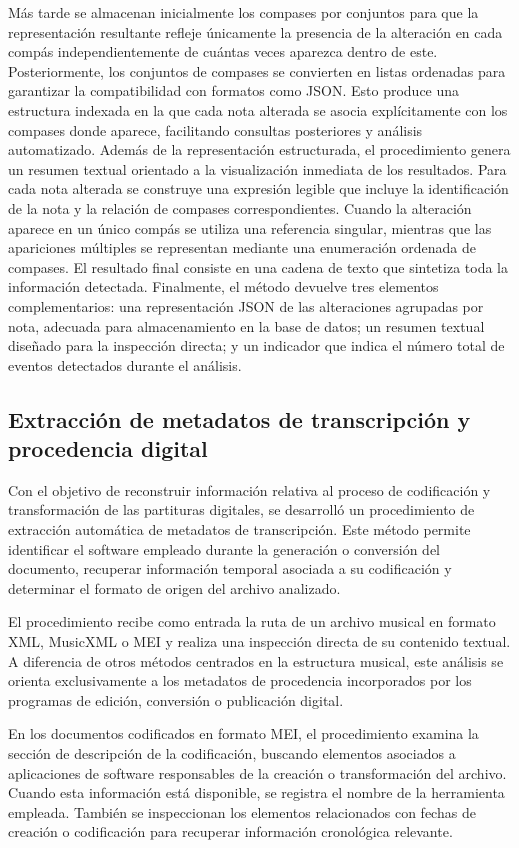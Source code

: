Más tarde se almacenan inicialmente los compases por conjuntos para que la representación resultante refleje únicamente la presencia de la alteración en cada compás independientemente de cuántas veces aparezca dentro de este. Posteriormente, los conjuntos de compases se convierten en listas ordenadas para garantizar la compatibilidad con formatos como JSON. Esto produce una estructura indexada en la que cada nota alterada se asocia explícitamente con los compases donde aparece, facilitando consultas posteriores y análisis automatizado. Además de la representación estructurada, el procedimiento genera un resumen textual orientado a la visualización inmediata de los resultados. Para cada nota alterada se construye una expresión legible que incluye la identificación de la nota y la relación de compases correspondientes. Cuando la alteración aparece en un único compás se utiliza una referencia singular, mientras que las apariciones múltiples se representan mediante una enumeración ordenada de compases. El resultado final consiste en una cadena de texto que sintetiza toda la información detectada. Finalmente, el método devuelve tres elementos complementarios: una representación JSON de las alteraciones agrupadas por nota, adecuada para almacenamiento en la base de datos; un resumen textual diseñado para la inspección directa; y un indicador que indica el número total de eventos detectados durante el análisis.

\subsection{Extracción de metadatos de transcripción y procedencia digital}
Con el objetivo de reconstruir información relativa al proceso de codificación y transformación de las partituras digitales, se desarrolló un procedimiento de extracción automática de metadatos de transcripción. Este método permite identificar el software empleado durante la generación o conversión del documento, recuperar información temporal asociada a su codificación y determinar el formato de origen del archivo analizado.

El procedimiento recibe como entrada la ruta de un archivo musical en formato XML, MusicXML o MEI y realiza una inspección directa de su contenido textual. A diferencia de otros métodos centrados en la estructura musical, este análisis se orienta exclusivamente a los metadatos de procedencia incorporados por los programas de edición, conversión o publicación digital.

En los documentos codificados en formato MEI, el procedimiento examina la sección de descripción de la codificación, buscando elementos asociados a aplicaciones de software responsables de la creación o transformación del archivo. Cuando esta información está disponible, se registra el nombre de la herramienta empleada. También se inspeccionan los elementos relacionados con fechas de creación o codificación para recuperar información cronológica relevante.

